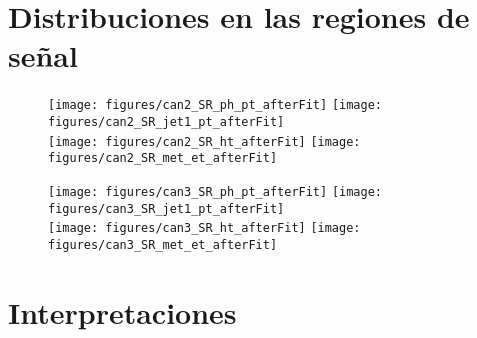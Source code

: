 
\section{Distribuciones en las regiones de se\~nal}


\begin{figure}[ht!]
  \begin{center}
   \texttt{[image: figures/can2\_SR\_ph\_pt\_afterFit]}
   \texttt{[image: figures/can2\_SR\_jet1\_pt\_afterFit]}\\
   \texttt{[image: figures/can2\_SR\_ht\_afterFit]}
   \texttt{[image: figures/can2\_SR\_met\_et\_afterFit]}
    \label{fig:unblind_dist_2}
  \end{center}
\end{figure}

\begin{figure}[h!]
  \begin{center}
   \texttt{[image: figures/can3\_SR\_ph\_pt\_afterFit]}
   \texttt{[image: figures/can3\_SR\_jet1\_pt\_afterFit]}\\
   \texttt{[image: figures/can3\_SR\_ht\_afterFit]}
   \texttt{[image: figures/can3\_SR\_met\_et\_afterFit]}
    \label{fig:unblind_dist_3}
  \end{center}
\end{figure}


\section{Interpretaciones} \label{sec:interpretations}


